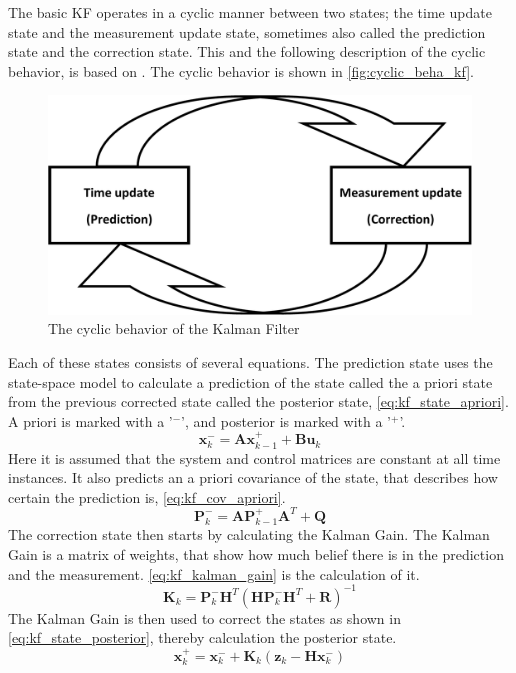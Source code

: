 \documentclass[Main]{subfiles}
\begin{document}
The basic KF operates in a cyclic manner between two states; the time update state and the measurement update state, sometimes also called the prediction state and the correction state. 
This and the following description of the cyclic behavior, is based on \cite{Simon2006}.
The cyclic behavior is shown in \autoref{fig:cyclic_beha_kf}.
\begin{figure}[H]
	\centering
	\includegraphics[width=0.5\linewidth]{./Figures/kf_states.png}
	\caption{The cyclic behavior of the Kalman Filter}
	\label{fig:cyclic_beha_kf}
\end{figure}\noindent
Each of these states consists of several equations. The prediction state uses the state-space model to calculate a prediction of the state called the a priori state from the previous corrected state called the posterior state, \autoref{eq:kf_state_apriori}.
A priori is marked with a '$^-$', and posterior is marked with a '$^+$'.
\begin{equation}
\label{eq:kf_state_apriori}
\mathbf{x}_k^-=\mathbf{A} \mathbf{x}_{k-1}^+ + \mathbf{B} \mathbf{u}_k
\end{equation}
Here it is assumed that the system and control matrices are constant at all time instances.
It also predicts an a priori covariance of the state, that describes how certain the prediction is, \autoref{eq:kf_cov_apriori}.
\begin{equation}
\label{eq:kf_cov_apriori}
\mathbf{P}_k^-=\mathbf{A} \mathbf{P}_{k-1}^+ \mathbf{A}^T+\mathbf{Q}
\end{equation}
The correction state then starts by calculating the Kalman Gain. 
The Kalman Gain is a matrix of weights, that show how much belief there is in the prediction and the measurement. \autoref{eq:kf_kalman_gain} is the calculation of it.
\begin{equation}
\label{eq:kf_kalman_gain}
\mathbf{K}_k = \mathbf{P}_k^- \mathbf{H}^T (\mathbf{H} \mathbf{P}_k^- \mathbf{H}^T + \mathbf{R})^{-1}
\end{equation}
The Kalman Gain is then used to correct the states as shown in \autoref{eq:kf_state_posterior}, thereby calculation the posterior state. 
\begin{equation}
\label{eq:kf_state_posterior}
\mathbf{x}_k^+ = \mathbf{x}_k^- + \mathbf{K}_k (\mathbf{z}_k - \mathbf{H} \mathbf{x}_k^-)
\end{equation}
\end{document}
